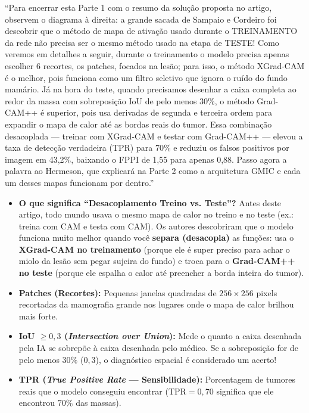 \documentclass[11pt,a4paper]{article}
\newenvironment{falabox}{%
    \begin{tcolorbox}[colback=speechbg, colframe=speechborder, boxrule=1.2pt, arc=4pt, left=10pt, right=10pt, top=8pt, bottom=8pt, title={\bfseries O QUE VOCÊ DEVE FALAR (Fala Sugerida)}]%
}{%
    \end{tcolorbox}%
}
\newenvironment{explicabox}{%
    \begin{tcolorbox}[colback=explainbg, colframe=explainborder, boxrule=0.8pt, arc=4pt, left=10pt, right=10pt, top=8pt, bottom=8pt, title={\bfseries ENTENDA O QUE VOCÊ ESTÁ FALANDO (Explicação Didática de Cada Termo)}]%
}{%
    \end{tcolorbox}%
}
\begin{document}
\begin{falabox}
``Para encerrar esta Parte 1 com o resumo da solução proposta no artigo, observem o diagrama à direita: a grande sacada de Sampaio e Cordeiro foi descobrir que o método de mapa de ativação usado durante o TREINAMENTO da rede não precisa ser o mesmo método usado na etapa de TESTE! Como veremos em detalhes a seguir, durante o treinamento o modelo precisa apenas escolher 6 recortes, os patches, focados na lesão; para isso, o método XGrad-CAM é o melhor, pois funciona como um filtro seletivo que ignora o ruído do fundo mamário. Já na hora do teste, quando precisamos desenhar a caixa completa ao redor da massa com sobreposição IoU de pelo menos 30\%, o método Grad-CAM++ é superior, pois usa derivadas de segunda e terceira ordem para expandir o mapa de calor até as bordas reais do tumor. Essa combinação desacoplada — treinar com XGrad-CAM e testar com Grad-CAM++ — elevou a taxa de detecção verdadeira (TPR) para 70\% e reduziu os falsos positivos por imagem em 43,2\%, baixando o FPPI de 1,55 para apenas 0,88. Passo agora a palavra ao Hermeson, que explicará na Parte 2 como a arquitetura GMIC e cada um desses mapas funcionam por dentro.''
\end{falabox}

\begin{explicabox}
\begin{itemize}[leftmargin=*, itemsep=4pt]
    \item \textbf{O que significa ``Desacoplamento Treino vs. Teste''?} Antes deste artigo, todo mundo usava o mesmo mapa de calor no treino e no teste (ex.: treina com CAM e testa com CAM). Os autores descobriram que o modelo funciona muito melhor quando você \textbf{separa (desacopla)} as funções: usa o \textbf{XGrad-CAM no treinamento} (porque ele é super preciso para achar o miolo da lesão sem pegar sujeira do fundo) e troca para o \textbf{Grad-CAM++ no teste} (porque ele espalha o calor até preencher a borda inteira do tumor).
    \item \textbf{Patches (Recortes):} Pequenas janelas quadradas de $256 \times 256$ pixels recortadas da mamografia grande nos lugares onde o mapa de calor brilhou mais forte.
    \item \textbf{IoU $\ge 0{,}3$ (\textit{Intersection over Union}):} Mede o quanto a caixa desenhada pela IA se sobrepõe à caixa desenhada pelo médico. Se a sobreposição for de pelo menos $30\%$ ($0{,}3$), o diagnóstico espacial é considerado um acerto!
    \item \textbf{TPR (\textit{True Positive Rate} — Sensibilidade):} Porcentagem de tumores reais que o modelo conseguiu encontrar ($\text{TPR} = 0{,}70$ significa que ele encontrou $70\%$ das massas).
\end{itemize}
\end{explicabox}
\end{document}

